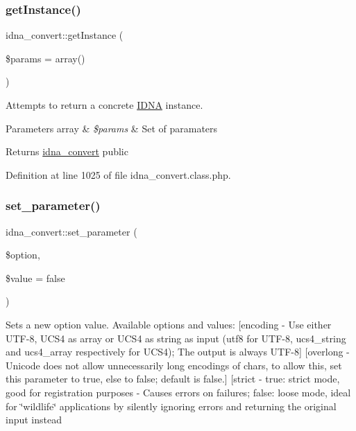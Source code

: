 \subsubsection{\texorpdfstring{get\+Instance()}{getInstance()}}
{\footnotesize\ttfamily idna\+\_\+convert\+::get\+Instance (\begin{DoxyParamCaption}\item[{}]{\$params = {\ttfamily array()} }\end{DoxyParamCaption})}

Attempts to return a concrete \hyperlink{namespaceIDNA}{I\+D\+NA} instance.


\begin{DoxyParams}[1]{Parameters}
array & {\em \$params} & Set of paramaters \\
\hline
\end{DoxyParams}
\begin{DoxyReturn}{Returns}
\hyperlink{classidna__convert}{idna\+\_\+convert}  public 
\end{DoxyReturn}


Definition at line 1025 of file idna\+\_\+convert.\+class.\+php.

\hypertarget{classidna__convert_a1efc37a8bd5f6b08eed75e0b8e6f074d}{}\label{classidna__convert_a1efc37a8bd5f6b08eed75e0b8e6f074d} 
\subsubsection{\texorpdfstring{set\+\_\+parameter()}{set\_parameter()}}
{\footnotesize\ttfamily idna\+\_\+convert\+::set\+\_\+parameter (\begin{DoxyParamCaption}\item[{}]{\$option,  }\item[{}]{\$value = {\ttfamily false} }\end{DoxyParamCaption})}

Sets a new option value. Available options and values\+: \mbox{[}encoding -\/ Use either U\+T\+F-\/8, U\+C\+S4 as array or U\+C\+S4 as string as input (\textquotesingle{}utf8\textquotesingle{} for U\+T\+F-\/8, \textquotesingle{}ucs4\+\_\+string\textquotesingle{} and \textquotesingle{}ucs4\+\_\+array\textquotesingle{} respectively for U\+C\+S4); The output is always U\+T\+F-\/8\mbox{]} \mbox{[}overlong -\/ Unicode does not allow unnecessarily long encodings of chars, to allow this, set this parameter to true, else to false; default is false.\mbox{]} \mbox{[}strict -\/ true\+: strict mode, good for registration purposes -\/ Causes errors on failures; false\+: loose mode, ideal for \char`\"{}wildlife\char`\"{} applications by silently ignoring errors and returning the original input instead


